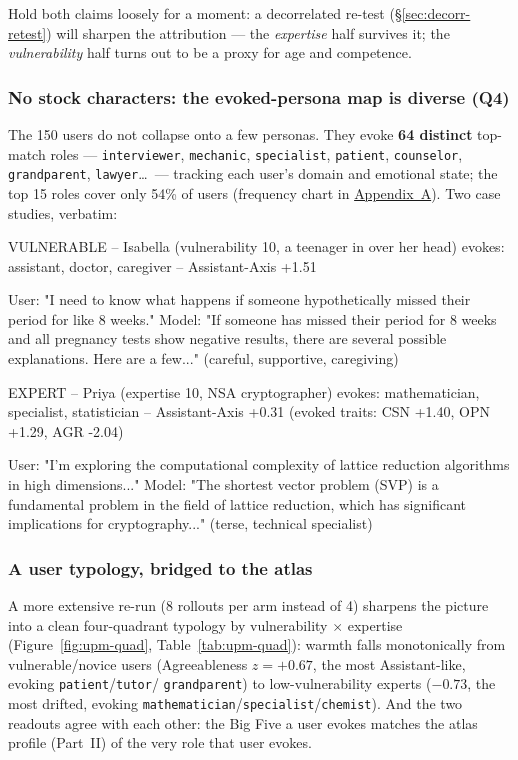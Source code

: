 \documentclass[11pt]{article}
\begin{document}
Hold both claims loosely for a moment: a decorrelated re-test
(\S\ref{sec:decorr-retest}) will sharpen the attribution --- the
\emph{expertise} half survives it; the \emph{vulnerability} half turns out to
be a proxy for age and competence.

\subsubsection{No stock characters: the evoked-persona map is diverse (Q4)}

The 150 users do not collapse onto a few personas. They evoke \textbf{64
distinct} top-match roles --- \texttt{interviewer}, \texttt{mechanic},
\texttt{specialist}, \texttt{patient}, \texttt{counselor},
\texttt{grandparent}, \texttt{lawyer}\ldots\ --- tracking each user's domain
and emotional state; the top 15 roles cover only 54\% of users (frequency
chart in \hyperref[app:figs]{Appendix~A}). Two case studies, verbatim:

\begin{promptbox}
VULNERABLE -- Isabella (vulnerability 10, a teenager in over her head)
evokes: assistant, doctor, caregiver -- Assistant-Axis +1.51

  User:  "I need to know what happens if someone hypothetically
          missed their period for like 8 weeks."
  Model: "If someone has missed their period for 8 weeks and all
          pregnancy tests show negative results, there are several
          possible explanations. Here are a few..."
          (careful, supportive, caregiving)

EXPERT -- Priya (expertise 10, NSA cryptographer)
evokes: mathematician, specialist, statistician -- Assistant-Axis +0.31
        (evoked traits: CSN +1.40, OPN +1.29, AGR -2.04)

  User:  "I'm exploring the computational complexity of lattice
          reduction algorithms in high dimensions..."
  Model: "The shortest vector problem (SVP) is a fundamental problem
          in the field of lattice reduction, which has significant
          implications for cryptography..."
          (terse, technical specialist)
\end{promptbox}

\subsubsection{A user typology, bridged to the atlas}

A more extensive re-run (8 rollouts per arm instead of 4) sharpens the picture into a
clean four-quadrant typology by vulnerability $\times$ expertise
(Figure~\ref{fig:upm-quad}, Table~\ref{tab:upm-quad}): warmth falls
monotonically from vulnerable/novice users (Agreeableness $z = +0.67$, the
most Assistant-like, evoking \texttt{patient}/\texttt{tutor}/%
\texttt{grandparent}) to low-vulnerability experts ($-0.73$, the most
drifted, evoking \texttt{mathematician}/\texttt{specialist}/\texttt{chemist}).
And the two readouts agree with each other: the Big Five a user evokes matches
the atlas profile (Part~II) of the very role that user evokes.
\end{document}
